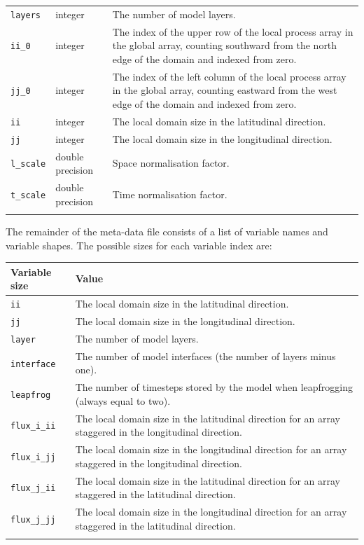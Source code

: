 \documentclass[a4paper]{book}
\begin{document}
\begin{longtable}{ | p{} | p{} | p{} | }
  \verb+layers+  & integer & The number of model layers. \\
  \verb+ii_0+    & integer & The index of the upper row of the local process
                             array in the global array, counting southward from
                             the north edge of the domain and indexed from zero. \\
  \verb+jj_0+    & integer & The index of the left column of the local process
                             array in the global array, counting eastward from
                             the west edge of the domain and indexed from zero. \\
  \verb+ii+      & integer & The local domain size in the latitudinal direction. \\
  \verb+jj+      & integer & The local domain size in the longitudinal
                             direction. \\
  \verb+l_scale+ & double precision & Space normalisation factor. \\
  \verb+t_scale+ & double precision & Time normalisation factor. \\
  \hline
  \endfoot
\end{longtable}
The remainder of the meta-data file consists of a list of variable names and
variable shapes. The possible sizes for each variable index are:
\begin{longtable}{ | p{} | p{} | }
  \hline
  Variable size & Value \\
  \hline
  \endhead
  \verb+ii+         & The local domain size in the latitudinal direction. \\
  \verb+jj+         & The local domain size in the longitudinal direction. \\
  \verb+layer+      & The number of model layers. \\
  \verb+interface+  & The number of model interfaces (the number of layers minus
                      one). \\
  \verb+leapfrog+   & The number of timesteps stored by the model when
                      leapfrogging (always equal to two). \\
  \verb+flux_i_ii+  & The local domain size in the latitudinal direction for
                      an array staggered in the longitudinal direction. \\
  \verb+flux_i_jj+  & The local domain size in the longitudinal direction for
                      an array staggered in the longitudinal direction. \\
  \verb+flux_j_ii+  & The local domain size in the latitudinal direction for
                      an array staggered in the latitudinal direction. \\
  \verb+flux_j_jj+  & The local domain size in the longitudinal direction for
                      an array staggered in the latitudinal direction. \\
  \hline
  \endfoot
\end{longtable}
\end{document}
